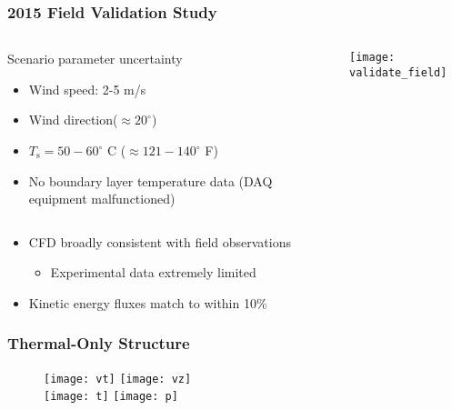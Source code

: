 \documentclass[mathserif]{beamer}
\begin{document}
%
%
%
\begin{frame}
\frametitle{2015 Field Validation Study}
 
\begin{columns}[]
  \begin{column}{0.52\linewidth}
   \begin{block}{Scenario parameter uncertainty}
    \begin{itemize}
     \item Wind speed: 2-5 m/s
     \item Wind direction($\approx20^{\circ}$)
     \item $T_{\text{s}} = 50-60^{\circ}$ C ($\approx 121-140^{\circ}$ F)
     \item No boundary layer temperature data 
	   (DAQ equipment malfunctioned)
    \end{itemize}
   \end{block}
  \end{column}

  \begin{column}{0.49\linewidth}

   \begin{center}
    \texttt{[image: validate\_field]}
   \end{center}
  \end{column}
 \end{columns}

 \begin{center}
  \begin{itemize}
   \item CFD broadly consistent with field observations
	 \begin{itemize}
	  \item Experimental data extremely limited
	 \end{itemize}
   \item Kinetic energy fluxes match to within 10\%
  \end{itemize}
  \end{center}

\end{frame}


%
%
%
\begin{frame}
\frametitle{Thermal-Only Structure}

\begin{figure}[!htb]
  \centering
  \texttt{[image: vt]}
  \hfill
  \texttt{[image: vz]}
  \\
  \texttt{[image: t]}
  \hfill
  \texttt{[image: p]}
\end{figure}


\end{frame}
\end{document}
